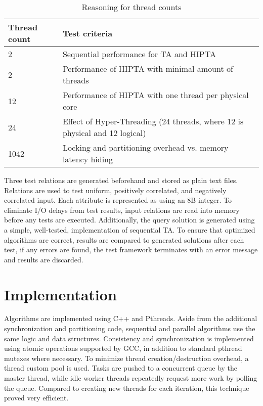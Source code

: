 \begin{table}[H]
	\centering
	\begin{tabular}{|l|l|}
	\hline
	Thread count & Test criteria \\ \hline
	2 & Sequential performance for TA and HIPTA \\
	2 & Performance of HIPTA with minimal amount of threads \\
	12 & Performance of HIPTA with one thread per physical core \\
	24 & Effect of Hyper-Threading (24 threads, where 12 is physical and 12 logical) \\
	1042 & Locking and partitioning overhead vs. memory latency hiding \\
	\hline
	\end{tabular}
	\caption{Reasoning for thread counts}
	\label{tab:threadcount}
\end{table}

Three test relations are generated beforehand and stored as plain text
files. Relations are used to test uniform, positively correlated, and
negatively correlated input. Each attribute is represented as using an
8B integer. To eliminate I/O delays from test results, input relations
are read into memory before any tests are executed. Additionally, the
query solution is generated using a simple, well-tested,
implementation of sequential TA. To ensure that optimized algorithms
are correct, results are compared to generated solutions after each
test, if any errors are found, the test framework terminates with an
error message and results are discarded.

\section{Implementation}
\label{sec:implementation}

Algorithms are implemented using C++ and Pthreads. Aside from the
additional synchronization and partitioning code, sequential and
parallel algorithms use the same logic and data structures.
Consistency and synchronization is implemented using atomic operations
supported by GCC, in addition to standard pthread mutexes where
necessary. To minimize thread creation/destruction overhead, a thread
custom pool is used. Tasks are pushed to a concurrent queue by the
master thread, while idle worker threads repeatedly request more work
by polling the queue. Compared to creating new threads for each
iteration, this technique proved very efficient.


